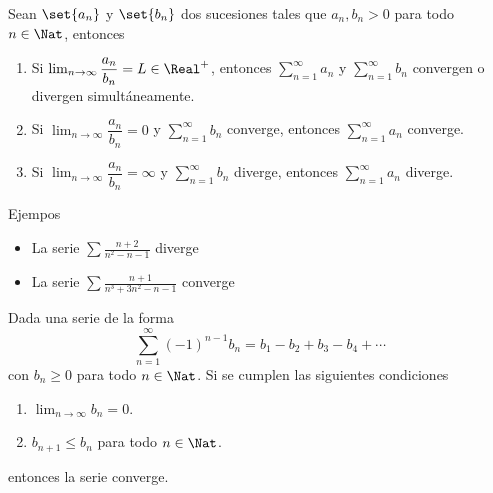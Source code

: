\begin{frame}
  \begin{thm}
    Sean $\set{a_n}$ y $\set{b_n}$ dos sucesiones tales que $a_n,b_n>0$ para todo $n\in\Nat$, entonces\\[0.5cm]
    \begin{enumerate}
      \item Si $\lim_{n\to\infty}\dfrac{a_n}{b_n}=L\in\Real^+$, entonces $\sum_{n=1}^{\infty}a_n$ y $\sum_{n=1}^{\infty}b_n$ convergen o divergen simultáneamente.\\[0.25cm]
      \item Si $\lim_{n\to\infty}\dfrac{a_n}{b_n}=0$ y $\sum_{n=1}^{\infty}b_n$ converge, entonces $\sum_{n=1}^{\infty}a_n$ converge.\\[0.25cm]
      \item Si $\lim_{n\to\infty}\dfrac{a_n}{b_n}=\infty$ y $\sum_{n=1}^{\infty}b_n$ diverge, entonces $\sum_{n=1}^{\infty}a_n$ diverge.
    \end{enumerate}    
  \end{thm}
\end{frame}

\begin{frame}{Ejempos}
  \begin{itemize}
    \item La serie $\displaystyle\sum\frac{n+2}{n^2-n-1}$ diverge
    \vspace{0.5cm}
    \item La serie $\displaystyle\sum\frac{n+1}{n^3+3n^2-n-1}$ converge
    \vspace{0.5cm}
  \end{itemize}
\end{frame}

\begin{frame}
  \begin{thm}
    Dada una serie de la forma
    $$\sum_{n=1}^{\infty}(-1)^{n-1}b_n=b_1-b_2+b_3-b_4+\cdots$$
    con $b_n\geq 0$ para todo $n\in\Nat$. Si se cumplen las siguientes condiciones
    \begin{enumerate}
      \item $\lim_{n\to\infty}b_n=0$.
      \item $b_{n+1}\leq b_n$ para todo $n\in\Nat$.
    \end{enumerate}
    entonces la serie converge.
  \end{thm}
\end{frame}

